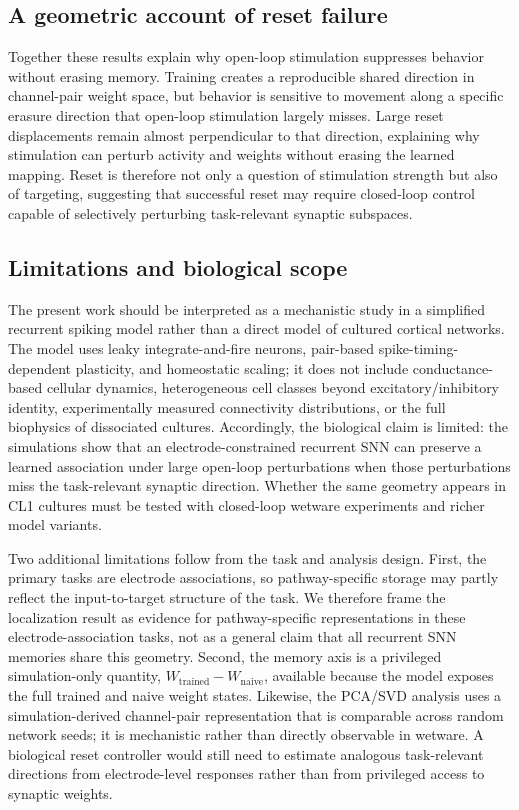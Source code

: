 \documentclass{article}
\begin{document}
\subsection*{A geometric account of reset failure}

Together these results explain why open-loop stimulation suppresses behavior without erasing memory. Training creates a reproducible shared direction in channel-pair weight space, but behavior is sensitive to movement along a specific erasure direction that open-loop stimulation largely misses. Large reset displacements remain almost perpendicular to that direction, explaining why stimulation can perturb activity and weights without erasing the learned mapping. Reset is therefore not only a question of stimulation strength but also of targeting, suggesting that successful reset may require closed-loop control capable of selectively perturbing task-relevant synaptic subspaces.

\subsection*{Limitations and biological scope}

The present work should be interpreted as a mechanistic study in a simplified recurrent spiking model rather than a direct model of cultured cortical networks. The model uses leaky integrate-and-fire neurons, pair-based spike-timing-dependent plasticity, and homeostatic scaling; it does not include conductance-based cellular dynamics, heterogeneous cell classes beyond excitatory/inhibitory identity, experimentally measured connectivity distributions, or the full biophysics of dissociated cultures. Accordingly, the biological claim is limited: the simulations show that an electrode-constrained recurrent SNN can preserve a learned association under large open-loop perturbations when those perturbations miss the task-relevant synaptic direction. Whether the same geometry appears in CL1 cultures must be tested with closed-loop wetware experiments and richer model variants.

Two additional limitations follow from the task and analysis design. First, the primary tasks are electrode associations, so pathway-specific storage may partly reflect the input-to-target structure of the task. We therefore frame the localization result as evidence for pathway-specific representations in these electrode-association tasks, not as a general claim that all recurrent SNN memories share this geometry. Second, the memory axis is a privileged simulation-only quantity, $W_{\mathrm{trained}} - W_{\mathrm{naive}}$, available because the model exposes the full trained and naive weight states. Likewise, the PCA/SVD analysis uses a simulation-derived channel-pair representation that is comparable across random network seeds; it is mechanistic rather than directly observable in wetware. A biological reset controller would still need to estimate analogous task-relevant directions from electrode-level responses rather than from privileged access to synaptic weights.
\end{document}

